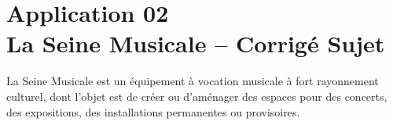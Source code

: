 \chapter*{Application 02 \\ La Seine Musicale -- \ifprof Corrigé \else Sujet \fi}

%
%
%
%
%
%
%
%
%
%
%
%
%
%
%
%
%
%

\ifprof
\else
La Seine Musicale est un équipement à vocation musicale à fort rayonnement culturel, dont l’objet est de créer
ou d’aménager des espaces pour des concerts, des expositions, des installations permanentes ou provisoires.


